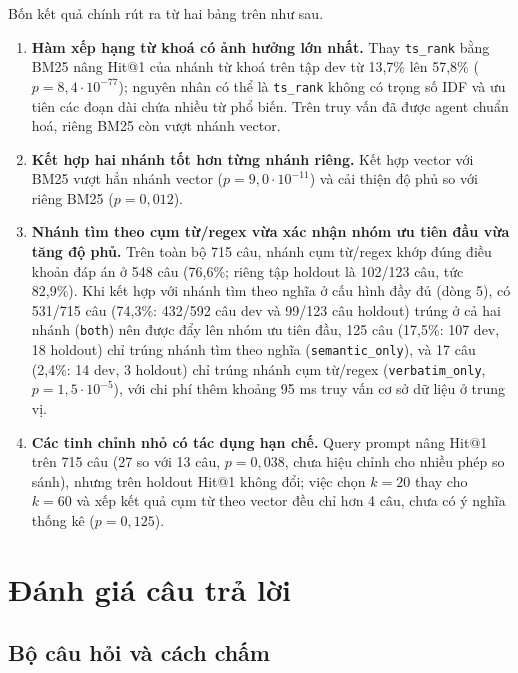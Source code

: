 Bốn kết quả chính rút ra từ hai bảng trên như sau.
\begin{enumerate}
    \item \textbf{Hàm xếp hạng từ khoá có ảnh hưởng lớn nhất.} Thay \texttt{ts\_rank} bằng BM25 nâng Hit@1 của nhánh từ khoá trên tập dev từ 13,7\% lên 57,8\% ($p = 8{,}4\cdot10^{-77}$); nguyên nhân có thể là \texttt{ts\_rank} không có trọng số IDF và ưu tiên các đoạn dài chứa nhiều từ phổ biến. Trên truy vấn đã được agent chuẩn hoá, riêng BM25 còn vượt nhánh vector.
    \item \textbf{Kết hợp hai nhánh tốt hơn từng nhánh riêng.} Kết hợp vector với BM25 vượt hẳn nhánh vector ($p = 9{,}0\cdot10^{-11}$) và cải thiện độ phủ so với riêng BM25 ($p = 0{,}012$).
    \item \textbf{Nhánh tìm theo cụm từ/regex vừa xác nhận nhóm ưu tiên đầu vừa tăng độ phủ.} Trên toàn bộ 715 câu, nhánh cụm từ/regex khớp đúng điều khoản đáp án ở 548 câu (76,6\%; riêng tập holdout là 102/123 câu, tức 82,9\%). Khi kết hợp với nhánh tìm theo nghĩa ở cấu hình đầy đủ (dòng 5), có 531/715 câu (74,3\%: 432/592 câu dev và 99/123 câu holdout) trúng ở cả hai nhánh (\texttt{both}) nên được đẩy lên nhóm ưu tiên đầu, 125 câu (17,5\%: 107 dev, 18 holdout) chỉ trúng nhánh tìm theo nghĩa (\texttt{semantic\_only}), và 17 câu (2,4\%: 14 dev, 3 holdout) chỉ trúng nhánh cụm từ/regex (\texttt{verbatim\_only}, $p = 1{,}5\cdot10^{-5}$), với chi phí thêm khoảng 95 ms truy vấn cơ sở dữ liệu ở trung vị.
    \item \textbf{Các tinh chỉnh nhỏ có tác dụng hạn chế.} Query prompt nâng Hit@1 trên 715 câu (27 so với 13 câu, $p = 0{,}038$, chưa hiệu chỉnh cho nhiều phép so sánh), nhưng trên holdout Hit@1 không đổi; việc chọn $k = 20$ thay cho $k = 60$ và xếp kết quả cụm từ theo vector đều chỉ hơn 4 câu, chưa có ý nghĩa thống kê ($p = 0{,}125$).
\end{enumerate}

\section{Đánh giá câu trả lời}
\label{sec:ch5-cau-tra-loi}

\subsection{Bộ câu hỏi và cách chấm}

